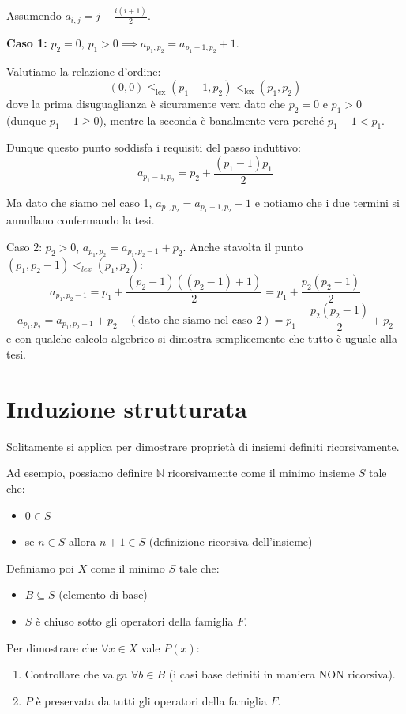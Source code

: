 \documentclass[12pt]{report}
\newcommand{\N}{\mathbb{N}}
\begin{document}
	Assumendo $a_{i, j} = j + \frac{i(i+1)}{2}$.
	
	\textbf{Caso 1:} $p_2 = 0, \, p_1 > 0 \implies a_{p_1, p_2} = a_{p_1-1, p_2} + 1$.
	
	Valutiamo la relazione d'ordine:
	\[
	(0, 0) \leq_{\text{lex}} (p_1-1, p_2) <_{\text{lex}} (p_1, p_2)
	\]
	dove la prima disuguaglianza è sicuramente vera dato che $p_2 = 0$ e $p_1 > 0$ (dunque $p_1 - 1 \geq 0$), mentre la seconda è banalmente vera perché $p_1 - 1 < p_1$.
	
	Dunque questo punto soddisfa i requisiti del passo induttivo:
	\[
	a_{p_1-1, p_2} = p_2 + \frac{(p_1-1)p_1}{2}
	\]
	
	Ma dato che siamo nel caso 1, $a_{p_1, p_2} = a_{p_1-1, p_2} + 1$ e notiamo che i due termini si annullano confermando la tesi.
	
	Caso $2$: $p_2 > 0$, $a_{p_1, p_2} = a_{p_1, p_2 - 1} + p_2$.
	Anche stavolta il punto $(p_1, p_2 - 1) <_{lex} (p_1, p_2)$:
	\[
	a_{p_1, p_2 - 1} = p_1 + \frac{(p_2 - 1)((p_2 - 1) + 1)}{2} = p_1 + \frac{p_2(p_2 - 1)}{2}
	\]
	\[
	a_{p_1, p_2} = a_{p_1, p_2 - 1} + p_2 \quad (\text{dato che siamo nel caso } 2) = p_1 + \frac{p_2(p_2 - 1)}{2} + p_2
	\]
	e con qualche calcolo algebrico si dimostra semplicemente che tutto è uguale alla tesi.
	
	\section{Induzione strutturata}
	Solitamente si applica per dimostrare proprietà di insiemi definiti ricorsivamente.
	
	Ad esempio, possiamo definire $\N$ ricorsivamente come il minimo insieme $S$ tale che:
	\begin{itemize}
		\item $0 \in S$
		\item se $n \in S$ allora $n + 1 \in S$ (definizione ricorsiva dell'insieme)
	\end{itemize}
	
	Definiamo poi $X$ come il minimo $S$ tale che:
	\begin{itemize}
		\item $B \subseteq S$ (elemento di base)
		\item $S$ è chiuso sotto gli operatori della famiglia $F$.
	\end{itemize}
	
	Per dimostrare che $\forall x \in X$ vale $P(x)$:
	\begin{enumerate}
		\item Controllare che valga $\forall b \in B$ (i casi base definiti in maniera NON ricorsiva).
		\item $P$ è preservata da tutti gli operatori della famiglia $F$.
	\end{enumerate}
	
\end{document}
